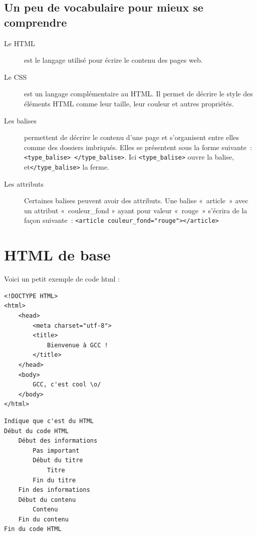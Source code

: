 \subsection{Un peu de vocabulaire pour mieux se comprendre}
\begin{description}
  \item[Le HTML] est le langage utilisé pour écrire le contenu des pages web.
  \item[Le CSS] est un langage complémentaire au HTML. Il permet de
    décrire le style des éléments HTML comme leur taille, leur couleur et autres
    propriétés.
  \item[Les balises] permettent de décrire le contenu d'une page et
    s'organisent entre elles comme des dossiers imbriqués.
    Elles se présentent sous la forme suivante : \texttt{<type_balise> </type_balise>}.
    Ici \texttt{<type_balise>} ouvre la balise, et\texttt{</type_balise>}
    la ferme.
  \item[Les attributs] Certaines balises peuvent avoir des attributs. Une
    balise « article » avec un attribut « couleur\_fond » ayant
    pour valeur « rouge » s’écrira de la façon suivante :
    \texttt{<article couleur_fond="rouge"></article>}
\end{description}

\section{HTML de base}
Voici un petit exemple de code html :

\begin{minipage}{0.55\textwidth}
\begin{verbatim}
<!DOCTYPE HTML>
<html>
    <head>
        <meta charset="utf-8">
        <title>
            Bienvenue à GCC !
        </title>
    </head>
    <body>
        GCC, c'est cool \o/
    </body>
</html>
\end{verbatim}
\end{minipage}
\begin{minipage}{0.45\textwidth}
\begin{verbatim}
Indique que c'est du HTML
Début du code HTML
    Début des informations
        Pas important
        Début du titre
            Titre
        Fin du titre
    Fin des informations
    Début du contenu
        Contenu
    Fin du contenu
Fin du code HTML
\end{verbatim}
\end{minipage}\\

